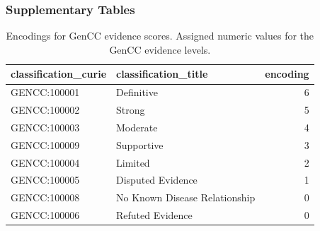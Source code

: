 \documentclass[
]{article}
\begin{document}
\subsubsection{Supplementary Tables}\label{supplementary-tables}

\begin{longtable}[]{@{}llr@{}}

\caption{\label{tbl-gencc}Encodings for GenCC evidence scores. Assigned
numeric values for the GenCC evidence levels.}

\tabularnewline

\toprule\noalign{}
classification\_curie & classification\_title & encoding \\
\midrule\noalign{}
\endhead
\bottomrule\noalign{}
\endlastfoot
GENCC:100001 & Definitive & 6 \\
GENCC:100002 & Strong & 5 \\
GENCC:100003 & Moderate & 4 \\
GENCC:100009 & Supportive & 3 \\
GENCC:100004 & Limited & 2 \\
GENCC:100005 & Disputed Evidence & 1 \\
GENCC:100008 & No Known Disease Relationship & 0 \\
GENCC:100006 & Refuted Evidence & 0 \\

\end{longtable}

\newpage{}
\end{document}
